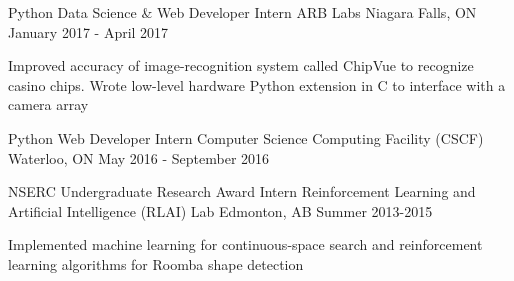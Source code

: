 \begin{cventries}

\cventry
{Python Data Science \& Web Developer Intern} %
{ARB Labs} %
{Niagara Falls, ON} %
{January 2017 - April 2017} %
{ %
\begin{cvitems}
\item {Improved accuracy of image-recognition system called ChipVue to recognize casino chips. Wrote low-level hardware Python extension in C to interface with a camera array}
\end{cvitems}
}


\cventry
{Python Web Developer Intern} %
{Computer Science Computing Facility (CSCF)} %
{Waterloo, ON} %
{May 2016 - September 2016} %
{ %
\begin{cvitems}
\end{cvitems}
}



\cventry
{NSERC Undergraduate Research Award Intern} %
{Reinforcement Learning and Artificial Intelligence (RLAI) Lab} %
{Edmonton, AB} %
{Summer 2013-2015} %
{ %
\begin{cvitems}
\item {Implemented machine learning for continuous-space search and reinforcement learning algorithms for Roomba shape detection}
\end{cvitems}
}

\end{cventries}